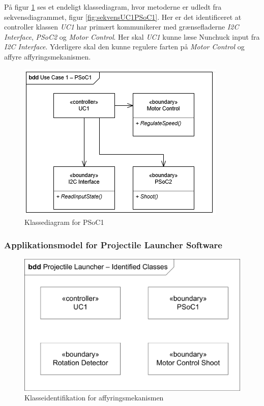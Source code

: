 På figur \ref{fig:klasseUC1PSoC1} ses et endeligt klassediagram, hvor metoderne er udledt fra sekvensdiagrammet, figur \ref{fig:sekvensUC1PSoC1}. Her er det identificeret at controller klassen \textit{UC1} har primært kommunikerer med grænsefladerne \textit{I2C Interface}, \textit{PSoC2} og \textit{Motor Control}. Her skal \textit{UC1} kunne læse Nunchuck input fra \textit{I2C Interface}. Yderligere skal den kunne regulere farten på \textit{Motor Control} og affyre affyringsmekanismen.

\begin{figure}[H]
	\centering
	\includegraphics[scale=0.8]{Systemarkitektur/images/klasseUC1PSoC1}
	\caption{Klassediagram for PSoC1}
	\label{fig:klasseUC1PSoC1}
\end{figure}

\subsubsection{Applikationsmodel for Projectile Launcher Software}

\begin{figure}[H]
	\centering
	\includegraphics[scale=0.8]{Systemarkitektur/images/affyringklasser.png}
	\caption{Klasseidentifikation for affyringsmekanismen}
	\label{fig:klasseidentifikationUC1PSoC2}
\end{figure}

